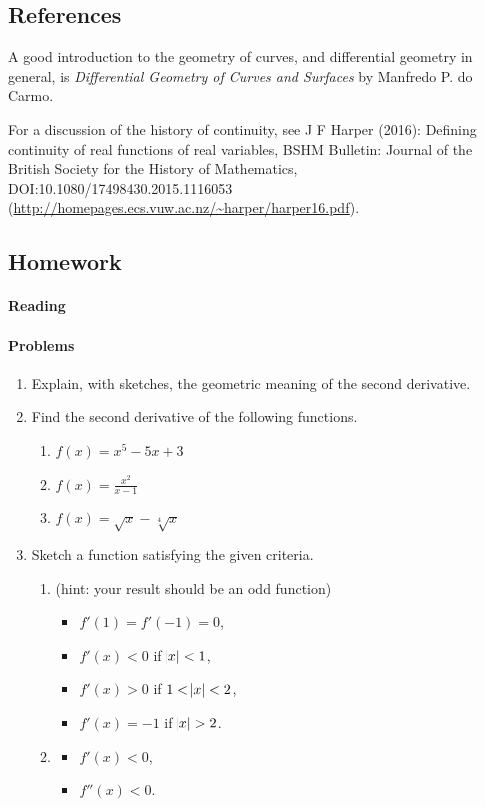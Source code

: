 \subsection{References}
A good introduction to the geometry of curves, and differential geometry in general, is \emph{Differential Geometry
of Curves and Surfaces} by Manfredo P. do Carmo.

For a discussion of the history of continuity, see J F Harper (2016): Defining continuity of
real functions of real variables, BSHM Bulletin: Journal of the British Society for the History
of Mathematics, DOI:10.1080/17498430.2015.1116053 (\url{http://homepages.ecs.vuw.ac.nz/~harper/harper16.pdf}).

\subsection{Homework}
\paragraph{Reading}

\paragraph{Problems}
\begin{enumerate}
  \item Explain, with sketches, the geometric meaning of the second derivative.
  \item Find the second derivative of the following functions.
    \begin{enumerate}
      \item $ f(x) = x^5 - 5x + 3 $
      \item $ f(x) = \frac{x^2}{x - 1} $
      \item $ f(x) = \sqrt{x} - \sqrt[4]{x} $
    \end{enumerate}
  \item Sketch a function satisfying the given criteria.
    \begin{enumerate}
      \item (hint: your result should be an odd function)
        \begin{itemize}
           \item $ f'(1) = f'(-1) = 0 $,
           \item $ f'(x) < 0 $ if $ \abs{x} < 1 $,
           \item $ f'(x) > 0 $ if $ 1 < \abs{x} < 2 $,
           \item $ f'(x) = -1 $ if $ \abs{x} > 2 $.
        \end{itemize}
      \item
        \begin{itemize}
          \item $ f'(x) < 0 $,
          \item $ f''(x) < 0 $.
        \end{itemize}
    \end{enumerate}
\end{enumerate}
